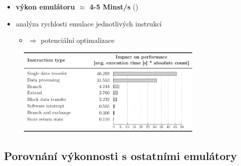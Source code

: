 \documentclass[compress]{beamer}
\begin{document}
\begin{frame}
	\begin{itemize}
		\item \textbf{výkon emulátoru $\approx$ 4-5 Minst/s} (\href{https://github.com/MartinUbl/KIV-RTOS}{})
		\item analýza rychlosti emulace jednotlivých instrukcí
		\begin{itemize}
			\item $\Rightarrow$ potenciální optimalizace
		\end{itemize}
	\end{itemize}
	\begin{figure}
		\centering
		\includegraphics[width=0.8\textwidth]{img/performance_2.pdf}
	\end{figure}
\end{frame}

\subsection{Porovnání výkonnosti s ostatními emulátory}
\end{document}
